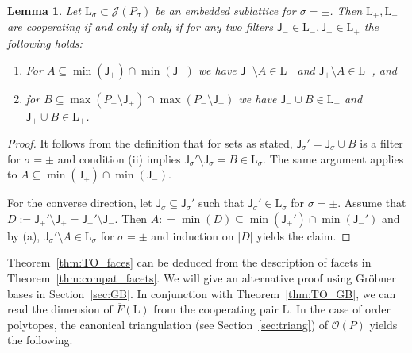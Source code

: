 \documentclass[11pt]{amsart}
\newtheorem{lem}[thm]{Lemma}
\theoremstyle{definition}
\begin{document}
\begin{lem}\label{lem:cond2}
    Let ${\mathrm{L}}_\sigma \subset {{\mathcal{J}}({{P}_\sigma})}$ be an embedded sublattice for
    $\sigma = \pm$.
     Then ${\mathrm{L}}_+, {\mathrm{L}}_-$
    are cooperating if and only if only if for any two filters 
    ${\mathsf{J}}_- \in {\mathrm{L}}_-, {\mathsf{J}}_+ \in {\mathrm{L}}_+$ the following holds:
    \begin{enumerate}[\rm (a)]
        \item For $A \subseteq \min({\mathsf{J}}_+) \cap \min({\mathsf{J}}_-)$ we have
            ${\mathsf{J}}_- \setminus A \in {\mathrm{L}}_- $  and 
            ${\mathsf{J}}_+ \setminus A \in {\mathrm{L}}_+ $, and  
    \item for $B \subseteq \max({P}_+ \setminus {\mathsf{J}}_+) \cap \max({P}_-
        \setminus {\mathsf{J}}_-)$ we have ${\mathsf{J}}_- \cup B \in {\mathrm{L}}_- $  and
        ${\mathsf{J}}_+ \cup B \in {\mathrm{L}}_+ $.
    \end{enumerate}
\end{lem}
\begin{proof}
    It follows from the definition that for sets as stated, ${\mathsf{J}}_\sigma' =
    {\mathsf{J}}_\sigma \cup B$ is a filter for $\sigma = \pm$ and condition (ii)
    implies ${\mathsf{J}}_\sigma' \setminus {\mathsf{J}}_\sigma = B \in {\mathrm{L}}_\sigma$. The
    same argument applies to $A \subseteq \min({\mathsf{J}}_+) \cap
    \min({\mathsf{J}}_-)$.

    For the converse direction, let ${\mathsf{J}}_\sigma \subseteq {\mathsf{J}}_\sigma'$
    such that ${\mathsf{J}}_\sigma' \in {\mathrm{L}}_\sigma$ for $\sigma = \pm$.  Assume that
    $D := {\mathsf{J}}_+' \setminus {\mathsf{J}}_+  = {\mathsf{J}}_-' \setminus {\mathsf{J}}_-$.
    Then $A : = \min(D) \subseteq \min({\mathsf{J}}_+') \cap \min({\mathsf{J}}_-')$ and
    by (a), ${\mathsf{J}}_\sigma' \setminus A \in {\mathrm{L}}_\sigma$ for $\sigma = \pm$ and
    induction on $|D|$ yields the claim.
\end{proof}

Theorem~\ref{thm:TO_faces} can be deduced from the description of facets in
Theorem~\ref{thm:compat_facets}. We will give an alternative proof using
Gr\"obner bases in Section~\ref{sec:GB}. In conjunction with
Theorem~\ref{thm:TO_GB}, we can read the dimension of ${\overline{F}({\mathrm{L}})}$ from the
cooperating pair ${\mathrm{L}}$.  In the case of order polytopes, the canonical
triangulation (see Section~\ref{sec:triang}) of ${\mathcal{O}({P})}$ yields the
following.
\end{document}
